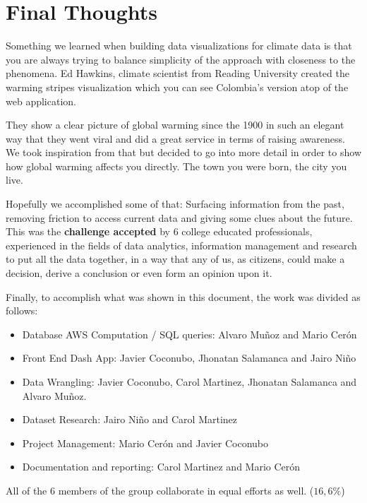 \section{Final Thoughts}
\label{sec:Conclu}

Something we learned when building data visualizations for climate data is that you are always trying to balance simplicity of the approach with closeness to the phenomena.  Ed Hawkins, climate scientist from Reading University created the warming stripes visualization which you can see Colombia's version atop of the web application.

They show a clear picture of global warming since the 1900 in such an elegant way that they went viral and did a great service in terms of raising awareness. We took inspiration from that but decided to go into more detail in order to show how global warming affects you directly. The town you were born, the city you live.

Hopefully we accomplished some of that: Surfacing information from the past, removing friction to access current data and giving some clues about the future. This was the \textbf{challenge accepted} by 6 college educated professionals, experienced in the fields of data analytics, information management and research to put all the data together, in a way that any of us, as citizens, could make a decision, derive a conclusion or even form an opinion upon it.

Finally, to accomplish what was shown in this document, the work was divided as follows:

\begin{itemize}

\item Database AWS Computation / SQL queries: Alvaro Mu\~noz and Mario Cer\'on
\item Front End Dash App: Javier Coconubo, Jhonatan Salamanca and Jairo Ni\~no
\item Data Wrangling: Javier Coconubo, Carol Martinez, Jhonatan Salamanca and Alvaro Mu\~noz.
\item Dataset Research: Jairo Ni\~no and Carol Martinez
\item Project Management: Mario Cer\'on and Javier Coconubo
\item Documentation and reporting: Carol Martinez and Mario Cer\'on

\end{itemize}

All of the 6 members of the group collaborate in equal efforts as well. ($16,6\%$) 
